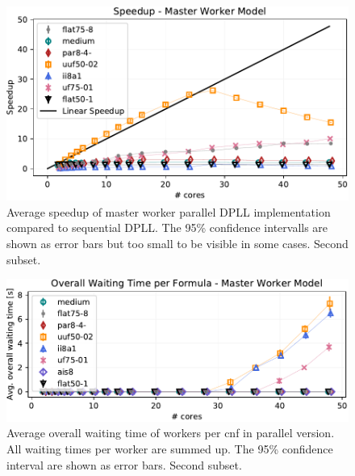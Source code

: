 \documentclass[letterpaper]{article}
\begin{document}
\begin{figure}[h]
    \centering
    \includegraphics[width=\columnwidth]{figures/scaling_parallel_non_subset_dpll_scaling_tar.pdf}
    \caption{Average speedup of master worker parallel DPLL implementation compared to sequential DPLL.
    The 95\% confidence intervalls are shown as error bars but too small to be visible in some cases.
    Second subset.}
    \label{fig:dpll_parallel_speedup_non}
\end{figure}

\begin{figure}[h]
    \centering
    \includegraphics[width=\columnwidth]{figures/waiting_parallel_non_subset_dpll_scaling_tar.pdf}
    \caption{Average overall waiting time of workers per cnf in parallel version.
    All waiting times per worker are summed up.
    The 95\% confidence interval are shown as error bars.
    Second subset.}
    \label{fig:dpll_parallel_waiting_non}
\end{figure}
\end{document}
